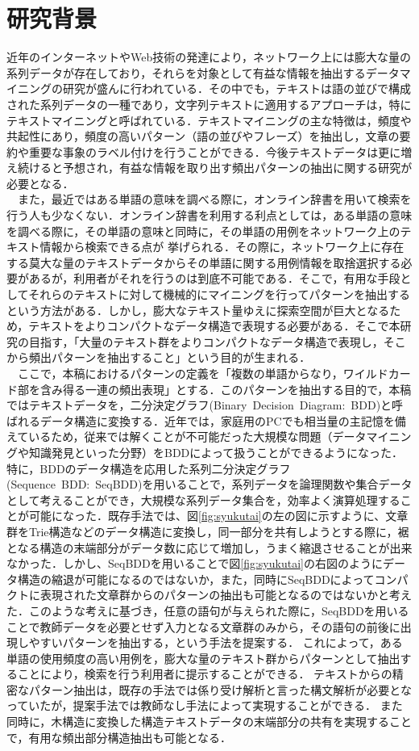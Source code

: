 \documentclass[12pt,twoside, fleqn]{ujbook}
\begin{document}
\section{研究背景}
近年のインターネットやWeb技術の発達により，ネットワーク上には膨大な量の系列データが存在しており，それらを対象として有益な情報を抽出するデータマイニングの研究が盛んに行われている．その中でも，テキストは語の並びで構成された系列データの一種であり，文字列テキストに適用するアプローチは，特にテキストマイニングと呼ばれている．テキストマイニングの主な特徴は，頻度や共起性にあり，頻度の高いパターン（語の並びやフレーズ）を抽出し，文章の要約や重要な事象のラベル付けを行うことができる．今後テキストデータは更に増え続けると予想され，有益な情報を取り出す頻出パターンの抽出に関する研究が必要となる．\\
　また，最近ではある単語の意味を調べる際に，オンライン辞書を用いて検索を行う人も少なくない．オンライン辞書を利用する利点としては，ある単語の意味を調べる際に，その単語の意味と同時に，その単語の用例をネットワーク上のテキスト情報から検索できる点が
挙げられる．その際に，ネットワーク上に存在する莫大な量のテキストデータからその単語に関する用例情報を取捨選択する必要があるが，利用者がそれを行うのは到底不可能である．そこで，有用な手段としてそれらのテキストに対して機械的にマイニングを行ってパターンを抽出するという方法がある．しかし，膨大なテキスト量ゆえに探索空間が巨大となるため，テキストをよりコンパクトなデータ構造で表現する必要がある．そこで本研究の目指す，「大量のテキスト群をよりコンパクトなデータ構造で表現し，そこから頻出パターンを抽出すること」という目的が生まれる．\\
　ここで，本稿におけるパターンの定義を「複数の単語からなり，ワイルドカード部を含み得る一連の頻出表現」とする．このパターンを抽出する目的で，本稿ではテキストデータを，二分決定グラフ(Binary\ Decision\ Diagram:\ BDD)と呼ばれるデータ構造に変換する．近年では，家庭用のPCでも相当量の主記憶を備えているため，従来では解くことが不可能だった大規模な問題（データマイニングや知識発見といった分野）をBDDによって扱うことができるようになった．特に，BDDのデータ構造を応用した系列二分決定グラフ(Sequence\ BDD:\ SeqBDD)を用いることで，系列データを論理関数や集合データとして考えることができ，大規模な系列データ集合を，効率よく演算処理することが可能になった．既存手法では、図\ref{fig:syukutai}の左の図に示すように、文章群をTrie構造などのデータ構造に変換し，同一部分を共有しようとする際に，裾となる構造の末端部分がデータ数に応じて増加し，うまく縮退させることが出来なかった．しかし、SeqBDDを用いることで図\ref{fig:syukutai}の右図のようにデータ構造の縮退が可能になるのではないか，また，同時にSeqBDDによってコンパクトに表現された文章群からのパターンの抽出も可能となるのではないかと考えた．このような考えに基づき，任意の語句が与えられた際に，SeqBDDを用いることで教師データを必要とせず入力となる文章群のみから，その語句の前後に出現しやすいパターンを抽出する，という手法を提案する．
これによって，ある単語の使用頻度の高い用例を，膨大な量のテキスト群からパターンとして抽出することにより，検索を行う利用者に提示することができる．
テキストからの精密なパターン抽出は，既存の手法では係り受け解析と言った構文解析が必要となっていたが，提案手法では教師なし手法によって実現することができる．
また同時に，木構造に変換した構造テキストデータの末端部分の共有を実現することで，有用な頻出部分構造抽出も可能となる．
\end{document}

